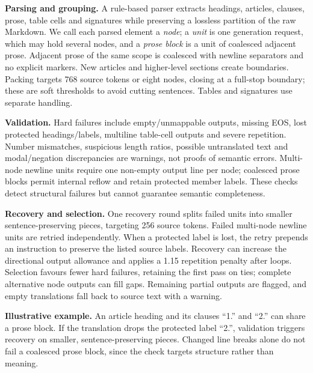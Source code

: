 \documentclass[11pt]{article}
\begin{document}
\textbf{Parsing and grouping.} A rule-based parser extracts headings, articles, clauses, prose, table cells and signatures while preserving a lossless partition of the raw Markdown. We call each parsed element a \emph{node}; a \emph{unit} is one generation request, which may hold several nodes, and a \emph{prose block} is a unit of coalesced adjacent prose. Adjacent prose of the same scope is coalesced with newline separators and no explicit markers. New articles and higher-level sections create boundaries. Packing targets 768 source tokens or eight nodes, closing at a full-stop boundary; these are soft thresholds to avoid cutting sentences. Tables and signatures use separate handling.

\textbf{Validation.} Hard failures include empty/unmappable outputs, missing EOS, lost protected headings/labels, multiline table-cell outputs and severe repetition. Number mismatches, suspicious length ratios, possible untranslated text and modal/negation discrepancies are warnings, not proofs of semantic errors. Multi-node newline units require one non-empty output line per node; coalesced prose blocks permit internal reflow and retain protected member labels. These checks detect structural failures but cannot guarantee semantic completeness.

\textbf{Recovery and selection.} One recovery round splits failed units into smaller sentence-preserving pieces, targeting 256 source tokens. Failed multi-node newline units are retried independently. When a protected label is lost, the retry prepends an instruction to preserve the listed source labels. Recovery can increase the directional output allowance and applies a 1.15 repetition penalty after loops. Selection favours fewer hard failures, retaining the first pass on ties; complete alternative node outputs can fill gaps. Remaining partial outputs are flagged, and empty translations fall back to source text with a warning.

\textbf{Illustrative example.} An article heading and its clauses ``1.'' and ``2.'' can share a prose block. If the translation drops the protected label ``2.'', validation triggers recovery on smaller, sentence-preserving pieces. Changed line breaks alone do not fail a coalesced prose block, since the check targets structure rather than meaning.
\end{document}
